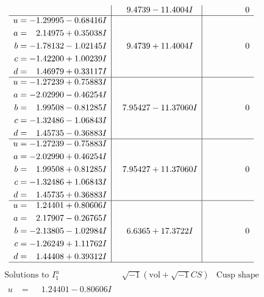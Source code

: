 \documentclass[1p]{elsarticle_modified}
\theoremstyle{definition}
\newcommand{\I}{\sqrt{-1}}
\begin{document}
$$\begin{array}{c|c|c}
 & \phantom{-}9.4739 - 11.4004 I & \phantom{-0.000000 } 0 \\ \hline\begin{aligned}
u &= -1.29995 - 0.68416 I \\
a &= \phantom{-}2.14975 + 0.35038 I \\
b &= -1.78132 - 1.02145 I \\
c &= -1.42200 + 1.00239 I \\
d &= \phantom{-}1.46979 + 0.33117 I\end{aligned}
 & \phantom{-}9.4739 + 11.4004 I & \phantom{-0.000000 } 0 \\ \hline\begin{aligned}
u &= -1.27239 + 0.75883 I \\
a &= -2.02990 - 0.46254 I \\
b &= \phantom{-}1.99508 - 0.81285 I \\
c &= -1.32486 - 1.06843 I \\
d &= \phantom{-}1.45735 - 0.36883 I\end{aligned}
 & \phantom{-}7.95427 - 11.37060 I & \phantom{-0.000000 } 0 \\ \hline\begin{aligned}
u &= -1.27239 - 0.75883 I \\
a &= -2.02990 + 0.46254 I \\
b &= \phantom{-}1.99508 + 0.81285 I \\
c &= -1.32486 + 1.06843 I \\
d &= \phantom{-}1.45735 + 0.36883 I\end{aligned}
 & \phantom{-}7.95427 + 11.37060 I & \phantom{-0.000000 } 0 \\ \hline\begin{aligned}
u &= \phantom{-}1.24401 + 0.80606 I \\
a &= \phantom{-}2.17907 - 0.26765 I \\
b &= -2.13805 - 1.02984 I \\
c &= -1.26249 + 1.11762 I \\
d &= \phantom{-}1.44408 + 0.39312 I\end{aligned}
 & \phantom{-}6.6365 + 17.3722 I & \phantom{-0.000000 } 0\\
 \hline 
 \end{array}$$\newpage$$\begin{array}{c|c|c}  
\text{Solutions to }I^u_{1}& \I (\text{vol} + \sqrt{-1}CS) & \text{Cusp shape}\\
 \hline 
\begin{aligned}
u &= \phantom{-}1.24401 - 0.80606 I \\

\end{aligned}
\end{array}$$
\end{document}
